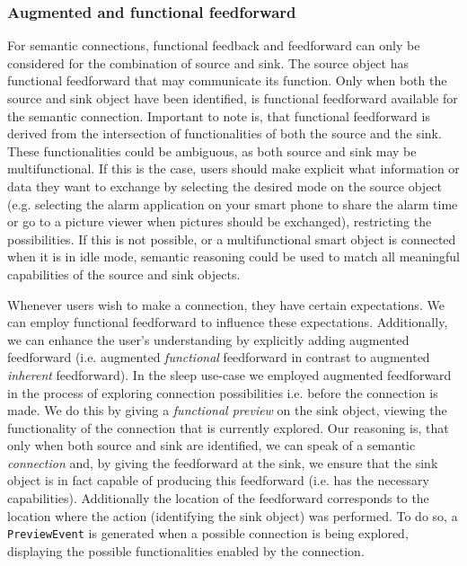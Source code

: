\subsubsection{Augmented and functional feedforward}
\label{section:augmentedFunctionalFf}
For semantic connections, functional feedback and feedforward can only be considered for the combination of source and sink. The source object has functional feedforward that may communicate its function. Only when both the source and sink object have been identified, is functional feedforward available for the semantic connection. Important to note is, that  functional feedforward is derived from the intersection of functionalities of both the source and the sink. These functionalities could be ambiguous, as both source and sink may be multifunctional. If this is the case, users should make explicit what information or data they want to exchange by selecting the desired mode on the source object (e.g. selecting the alarm application on your smart phone to share the alarm time or go to a picture viewer when pictures should be exchanged), restricting the possibilities. If this is not possible, or a multifunctional smart object is connected when it is in idle mode, semantic reasoning could be used to match all meaningful capabilities of the source and sink objects.

Whenever users wish to make a connection, they have certain expectations. We can employ functional feedforward to influence these expectations. Additionally, we can enhance the user's understanding by explicitly adding augmented feedforward (i.e. augmented \emph{functional} feedforward in contrast to augmented \emph{inherent} feedforward). In the sleep use-case we em\-ployed augmented feedforward in the process of exploring connection possibilities i.e. before the connection is made. We do this by giving a \emph{functional preview} on the sink object, viewing the functionality of the connection that is currently explored. Our reasoning is, that only when both source and sink are identified, we can speak of a semantic \emph{connection} and, by giving the feedforward at the sink, we ensure that the sink object is in fact capable of producing this feedforward (i.e. has the necessary capabilities). Additionally the location of the feedforward corresponds to the location where the action (identifying the sink object) was performed. To do so, a \texttt{PreviewEvent} is generated  when a possible connection is being explored, displaying the possible functionalities enabled by the connection.

